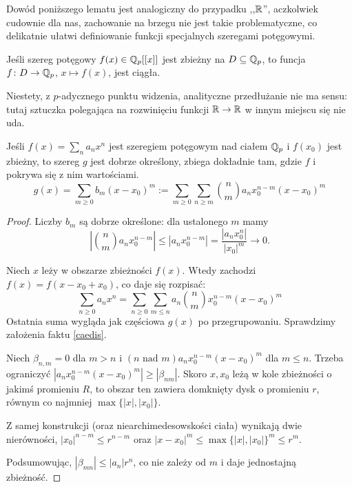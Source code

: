 Dowód  poniższego lematu jest analogiczny do przypadku ,,$\mathbb R$'', aczkolwiek cudownie dla nas, zachowanie na brzegu nie jest takie problematyczne, co delikatnie ułatwi definiowanie funkcji specjalnych szeregami potęgowymi.


\begin{lemat}
	Jeśli szereg potęgowy $f(x) \in \mathbb Q_p[[x]]$ jest zbieżny na $D \subseteq \mathbb Q_p$, to funcja $f \colon D \to \mathbb Q_p$, $x \mapsto f(x)$, jest ciągła.
\end{lemat}

Niestety, z $p$-adycznego punktu widzenia, analityczne przedłużanie nie ma sensu: tutaj sztuczka polegająca na rozwinięciu funkcji $\mathbb R \to \mathbb R$ w innym miejscu się nie uda.

\begin{fakt}
	Jeśli $f(x) = \sum_n a_n x^n$ jest szeregiem potęgowym nad ciałem $\mathbb Q_p$ i $f(x_0)$ jest zbieżny, to szereg $g$ jest dobrze określony, zbiega dokładnie tam, gdzie $f$ i pokrywa się z nim wartościami.
	\[
		g(x) = \sum_{m \ge 0} b_m (x - x_0)^m := \sum_{m \ge 0} \sum_{n \ge m} {n \choose m} a_n x_0^{n-m} (x-x_0)^m
	\]
\end{fakt}

\begin{proof}
	Liczby $b_m$ są dobrze określone: dla ustalonego $m$ mamy
	\[
		\left|{n \choose m} a_n x_0^{n-m}\right| \le |a_n x_0^{n-m}| = \frac{|a_nx_0^n|}{|x_0|^m} \to 0.
	\]

	Niech $x$ leży w obszarze zbieżności $f(x)$.
	Wtedy zachodzi $f(x) = f(x - x_0 + x_0)$, co daje się rozpisać:
	\[
		\sum_{n \ge 0} a_n x^n = \sum_{n \ge 0} \sum_{m \le n} a_n  {n \choose m} x_0^{n-m} (x-x_0)^m
	\]
	Ostatnia suma wygląda jak częściowa $g(x)$ po przegrupowaniu.
	Sprawdzimy założenia faktu \ref{caedis}.

	Niech $\beta_{n, m} = 0$ dla $m > n$ i $(n \textrm{ nad } m )a_n x_0^{n-m}(x - x_0)^m$ dla $m \le n$.
	Trzeba ograniczyć $|a_n x_0^{n-m} (x - x_0)^m| \ge |\beta_{nm}|$.
	Skoro $x, x_0$ leżą w kole zbieżności o jakimś promieniu $R$, to obszar ten zawiera domknięty dysk o promieniu $r$, równym co najmniej $\max \{|x|, |x_0|\}$.

	Z samej konstrukcji (oraz niearchimedesowskości ciała) wynikają dwie nierówności, $|x_0|^{n-m} \le r^{n-m}$ oraz $|x - x_0|^m \le \max \{|x|, |x_0|\}^m \le r^m$.

	Podsumowując, $|\beta_{mn}| \le |a_n| r^n$, co nie zależy od $m$ i daje jednostajną zbieżność.
\end{proof}

